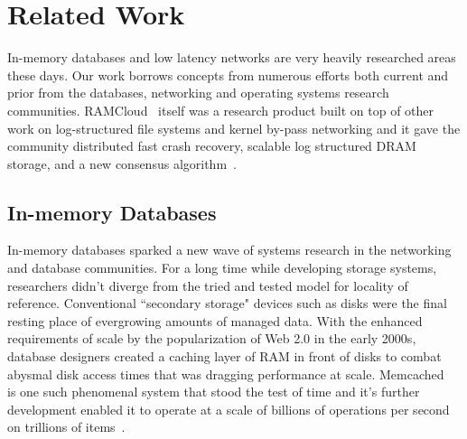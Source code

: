 
\chapter{Related Work}
\label{chap:relatedwork}

In-memory databases and low latency networks are very heavily researched areas
these days. Our work borrows concepts from numerous efforts both current and 
prior from the databases, networking and operating systems research communities.
RAMCloud~\cite{ramcloud} itself was a research product built on top of other 
work on log-structured file systems and kernel by-pass networking and it gave the 
community distributed fast crash recovery, scalable log structured DRAM storage, and a new consensus 
algorithm~\cite{ryan-thesis,ongaro2011fast,ramcloudfast,raft}.

\section{In-memory Databases}
In-memory databases sparked a new wave of systems research in the 
networking and database communities. For a long time while developing storage
systems, researchers didn't diverge from the  tried and tested model for
locality of reference. Conventional ``secondary storage" devices
such as disks were the final resting place of evergrowing amounts of managed data. With the 
enhanced requirements of scale by the popularization of Web 2.0 in the early 2000s, 
database designers created a caching layer of RAM in front of disks
to combat abysmal disk access times that was dragging performance at scale. Memcached~\cite{memcached-orig}
is one such phenomenal system that stood the test of time and it's further development
enabled it to operate at a scale of billions of operations per second on trillions of items~\cite{nishtala2013scaling}.

